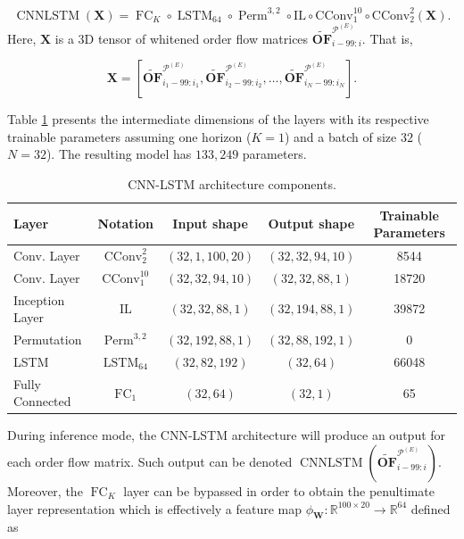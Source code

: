 \documentclass[10pt,a4paper,oneside]{article}
\newcommand{\R}{\mathbb{R}}
\DeclareMathOperator{\perm}{Perm}
\DeclareMathOperator{\fullyconnected}{FC}
\DeclareMathOperator{\lstm}{LSTM}
\DeclareMathOperator{\cnnlstm}{CNNLSTM}
\begin{document}
$$
\cnnlstm(\mathbf{X}) = \fullyconnected_K \circ \lstm_{64} \circ \perm^{3, 2} \circ \mathrm{IL} \circ \mathrm{CConv}^{10}_1 \circ \mathrm{CConv}^{2}_2 \left(\mathbf{X}\right).
$$
Here, $\mathbf{X}$ is a 3D tensor of whitened order flow matrices $\widetilde{\mathbf{OF}}^{\mathcal{P}^{(E)}}_{i - 99:i}$. That is,

$$
\mathbf{X} = \left[ \widetilde{\mathbf{OF}}^{\mathcal{P}^{(E)}}_{i_1 - 99:i_1}, \widetilde{\mathbf{OF}}^{\mathcal{P}^{(E)}}_{i_2 - 99:i_2}, \dots, \widetilde{\mathbf{OF}}^{\mathcal{P}^{(E)}}_{i_N - 99:i_N}\right].
$$

Table \ref{tab:cnnlstm} presents the intermediate dimensions of the layers with its respective trainable parameters assuming one horizon ($K = 1$) and a batch of size $32$ ($N = 32$). The resulting model has $133,249$ parameters.


\begin{table}[htb]
  \caption{CNN-LSTM architecture components.}
  \label{tab:cnnlstm}

\centering
\begin{tabular}{@{}lcccc@{}}
\toprule
Layer           & Notation           & Input shape        & Output shape          & Trainable Parameters  \\ \midrule
Conv. Layer     & $\mathrm{CConv}^{2}_2$   & $(32, 1, 100, 20)$ & $(32,  32,  94, 10)$ & 8544           \\
Conv. Layer     & $\mathrm{CConv}^{10}_1$  & $(32, 32, 94, 10)$ & $(32, 32, 88, 1)$    & 18720           \\
Inception Layer & $\mathrm{IL}$            & $(32,  32, 88, 1)$ & $(32, 194, 88, 1)$   & 39872           \\
Permutation     & $\perm^{3,2}$            & $(32, 192, 88, 1)$ & $(32, 88, 192, 1)$   & 0               \\
LSTM            & $\lstm_{64}$             & $(32, 82, 192)$    & $(32, 64)$           & 66048           \\ 
Fully Connected & $\fullyconnected_{1}$    & $(32, 64)$         & $(32, 1)$            & 65   \\\bottomrule
\end{tabular}

\end{table}

During inference mode, the CNN-LSTM architecture will produce an output for each order flow matrix. Such output can be denoted $\cnnlstm \left(\widetilde{\mathbf{OF}}^{\mathcal{P}^{(E)}}_{i - 99:i} \right)$. Moreover, the $\fullyconnected_K$ layer can be bypassed in order to obtain the penultimate layer representation which is effectively a feature map $\phi_{\mathbf{W}} : \R^{100 \times 20} \rightarrow \R^{64}$ defined as
\end{document}
